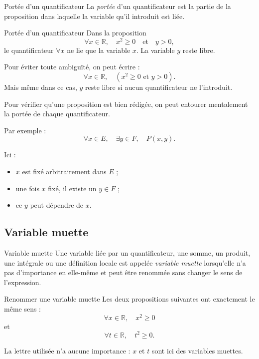 \documentclass[11pt,a4paper]{article}
\begin{document}
\begin{definitionbox}{Portée d'un quantificateur}{}
La \emph{portée} d'un quantificateur est la partie de la proposition dans laquelle la variable qu'il introduit est liée.
\end{definitionbox}

\begin{exemplebox}{Portée d'un quantificateur}{}
Dans la proposition
\[
\forall x\in\mathbb{R},\quad x^2\geq 0 \quad \text{et} \quad y>0,
\]
le quantificateur $\forall x$ ne lie que la variable $x$. La variable $y$ reste libre.

Pour éviter toute ambiguïté, on peut écrire :
\[
\forall x\in\mathbb{R},\quad \left(x^2\geq 0 \text{ et } y>0\right).
\]
Mais même dans ce cas, $y$ reste libre si aucun quantificateur ne l'introduit.
\end{exemplebox}

\begin{methodebox}
Pour vérifier qu'une proposition est bien rédigée, on peut entourer mentalement la portée de chaque quantificateur.

Par exemple :
\[
\forall x\in E,\quad \exists y\in F,\quad P(x,y).
\]

Ici :
\begin{itemize}
    \item $x$ est fixé arbitrairement dans $E$ ;
    \item une fois $x$ fixé, il existe un $y\in F$ ;
    \item ce $y$ peut dépendre de $x$.
\end{itemize}
\end{methodebox}

\subsection{Variable muette}

\begin{definitionbox}{Variable muette}{}
Une variable liée par un quantificateur, une somme, un produit, une intégrale ou une définition locale est appelée \emph{variable muette} lorsqu'elle n'a pas d'importance en elle-même et peut être renommée sans changer le sens de l'expression.
\end{definitionbox}

\begin{exemplebox}{Renommer une variable muette}{}
Les deux propositions suivantes ont exactement le même sens :
\[
\forall x\in\mathbb{R},\quad x^2\geq 0
\]
et
\[
\forall t\in\mathbb{R},\quad t^2\geq 0.
\]

La lettre utilisée n'a aucune importance : $x$ et $t$ sont ici des variables muettes.
\end{exemplebox}
\end{document}
